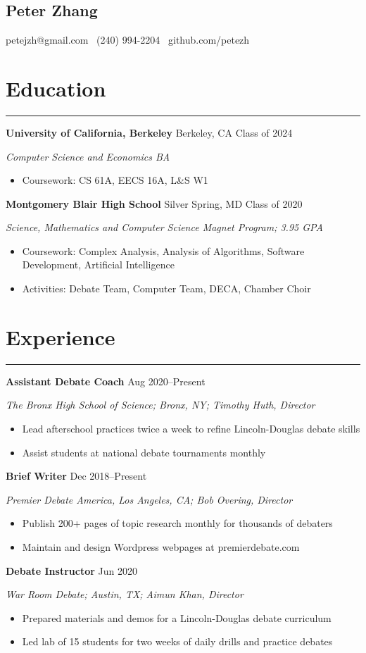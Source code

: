 \documentclass[11pt]{article}
\newcommand{\name}[1]{\begin{center}\section*{\huge \color{highlight} #1}\end{center}}
\newcommand{\topinfo}[1]{\begin{center}\vspace{-0.2cm}#1\vspace{-0.2cm}\end{center}}
\newcommand{\resumesection}[1]{\vspace{-0.3cm}\section*{\color{highlight}#1}\vspace{-0.3cm}\hrule\vspace{0.3cm}}
\begin{document}
\name{Peter Zhang}
\topinfo{petejzh@gmail.com \textbullet\ (240) 994-2204 \textbullet\ github.com/petezh}

\resumesection{Education}

\textbf{University of California, Berkeley} Berkeley, CA \hfill Class of 2024 \par
\textit{Computer Science and Economics BA}
\begin{itemize}
	\item Coursework: CS 61A, EECS 16A, L\&S W1
\end{itemize}

\textbf{Montgomery Blair High School} Silver Spring, MD \hfill Class of 2020 \par
\textit{Science, Mathematics and Computer Science Magnet Program; 3.95 GPA}

\begin{itemize}
	\item Coursework: Complex Analysis, Analysis of Algorithms, Software Development, Artificial Intelligence
	\item Activities: Debate Team, Computer Team, DECA, Chamber Choir
\end{itemize}

\resumesection{Experience}

\textbf{Assistant Debate Coach}  \hfill Aug 2020--Present \par
\textit{The Bronx High School of Science; Bronx, NY; Timothy Huth, Director}
\begin{itemize}
	\item Lead afterschool practices twice a week to refine Lincoln-Douglas debate skills
	\item Assist students at national debate tournaments monthly
\end{itemize}

\textbf{Brief Writer} \hfill Dec 2018--Present \par
\textit{Premier Debate America, Los Angeles, CA; Bob Overing, Director}
\begin{itemize}
	\item Publish 200+ pages of topic research monthly for thousands of debaters
	\item Maintain and design Wordpress webpages at premierdebate.com
\end{itemize}

\textbf{Debate Instructor}  \hfill Jun 2020 \par
\textit{War Room Debate; Austin, TX; Aimun Khan, Director}
\begin{itemize}
	\item Prepared materials and demos for a Lincoln-Douglas debate curriculum
	\item Led lab of 15 students for two weeks of daily drills and practice debates
\end{itemize}
\end{document}
